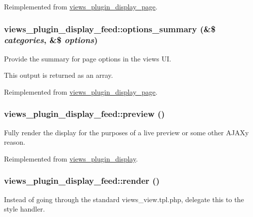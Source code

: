 Reimplemented from \hyperlink{classviews__plugin__display__page_a9b03d35a15fcfcae4a474ea56b6ca5b6}{views\_\-plugin\_\-display\_\-page}.\hypertarget{classviews__plugin__display__feed_a5c0b5faad36090985c85b16a454023a6}{
\subsubsection[{options\_\-summary}]{\setlength{\rightskip}{0pt plus 5cm}views\_\-plugin\_\-display\_\-feed::options\_\-summary (\&\$ {\em categories}, \/  \&\$ {\em options})}}
\label{classviews__plugin__display__feed_a5c0b5faad36090985c85b16a454023a6}
Provide the summary for page options in the views UI.

This output is returned as an array. 

Reimplemented from \hyperlink{classviews__plugin__display__page_a47de087f3201600b057e0d4a55eef48c}{views\_\-plugin\_\-display\_\-page}.\hypertarget{classviews__plugin__display__feed_ae5e20d2999e052f50486b5d03b4fb105}{
\subsubsection[{preview}]{\setlength{\rightskip}{0pt plus 5cm}views\_\-plugin\_\-display\_\-feed::preview ()}}
\label{classviews__plugin__display__feed_ae5e20d2999e052f50486b5d03b4fb105}
Fully render the display for the purposes of a live preview or some other AJAXy reason. 

Reimplemented from \hyperlink{classviews__plugin__display_a39a392ae163b9d5850559e3cf098e64f}{views\_\-plugin\_\-display}.\hypertarget{classviews__plugin__display__feed_a661fe08fd1be956d5b5cc40f36daf26b}{
\subsubsection[{render}]{\setlength{\rightskip}{0pt plus 5cm}views\_\-plugin\_\-display\_\-feed::render ()}}
\label{classviews__plugin__display__feed_a661fe08fd1be956d5b5cc40f36daf26b}
Instead of going through the standard views\_\-view.tpl.php, delegate this to the style handler. 

